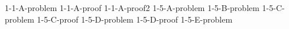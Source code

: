\documentclass[uplatex, dvipdfmx, a4paper, 12pt, class=jsarticle, crop=false]{standalone}
\begin{document}
	{1-1-A-problem}
	{1-1-A-proof}
	{1-1-A-proof2}
	{1-5-A-problem}
	{1-5-B-problem}
	{1-5-C-problem}
	{1-5-C-proof}
	{1-5-D-problem}
	{1-5-D-proof}
	{1-5-E-problem}
\end{document}
